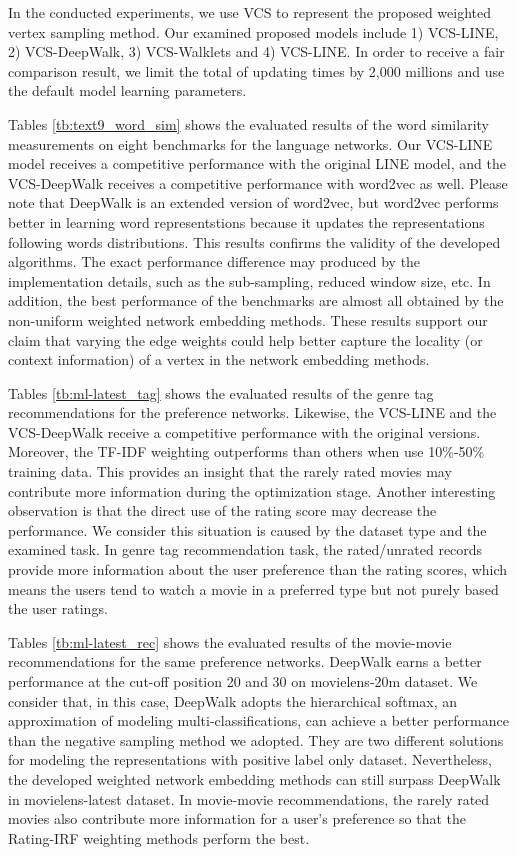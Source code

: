 In the conducted experiments, we use VCS to represent the proposed weighted vertex sampling method.  Our examined proposed models include 1) VCS-LINE, 2) VCS-DeepWalk, 3) VCS-Walklets and 4) VCS-LINE.  In order to receive a fair comparison result, we limit the total of updating times by 2,000 millions and use the default model learning parameters.

Tables \ref{tb:text9_word_sim} shows the evaluated results of the word similarity measurements on eight benchmarks for the language networks.  Our VCS-LINE model receives a competitive performance with the original LINE model, and the VCS-DeepWalk receives a competitive performance with word2vec as well.  Please note that DeepWalk is an extended version of word2vec, but word2vec performs better in learning word representstions because it updates the representations following words distributions. This results confirms the validity of the developed algorithms. The exact performance difference may produced by the implementation details, such as the sub-sampling, reduced window size, etc.  In addition, the best performance of the benchmarks are almost all obtained by the non-uniform weighted network embedding methods.  These results support our claim that varying the edge weights could help better capture the locality (or context information) of a vertex in the network embedding methods.

Tables \ref{tb:ml-latest_tag} shows the evaluated results of the genre tag recommendations for the preference networks. Likewise, the VCS-LINE and the VCS-DeepWalk receive a competitive performance with the original versions.  Moreover, the TF-IDF weighting outperforms than others when use 10\%-50\% training data.  This provides an insight that the rarely rated movies may contribute more information during the optimization stage. Another interesting observation is that the direct use of the rating score may decrease the performance.  We consider this situation is caused by the dataset type and the examined task.  In genre tag recommendation task, the rated/unrated records provide more information about the user preference than the rating scores, which means the users tend to watch a movie in a preferred type but not purely based the user ratings.

Tables \ref{tb:ml-latest_rec} shows the evaluated results of the movie-movie recommendations for the same preference networks. DeepWalk earns a better performance at the cut-off position 20 and 30 on movielens-20m dataset.  We consider that, in this case, DeepWalk adopts the hierarchical softmax, an approximation of modeling multi-classifications, can achieve a better performance than the negative sampling method we adopted. They are two different solutions for modeling the representations with positive label only dataset.  Nevertheless, the developed weighted network embedding methods can still surpass DeepWalk in movielens-latest dataset.  In movie-movie recommendations, the rarely rated movies also contribute more information for a user's preference so that the Rating-IRF weighting methods perform the best.


